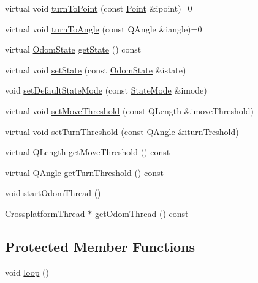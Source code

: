 \begin{DoxyCompactItemize}
\item 
virtual void \mbox{\hyperlink{classokapi_1_1OdomChassisController_a4566bc34f36fd107bc868b17942f4245}{turn\+To\+Point}} (const \mbox{\hyperlink{structokapi_1_1Point}{Point}} \&ipoint)=0
\item 
virtual void \mbox{\hyperlink{classokapi_1_1OdomChassisController_ac90298bb9081d95c52800dbf679dd658}{turn\+To\+Angle}} (const Q\+Angle \&iangle)=0
\item 
virtual \mbox{\hyperlink{structokapi_1_1OdomState}{Odom\+State}} \mbox{\hyperlink{classokapi_1_1OdomChassisController_a4f4a588ea6e302e9cf13fb776ce0c5e4}{get\+State}} () const
\item 
virtual void \mbox{\hyperlink{classokapi_1_1OdomChassisController_a1e3a4b62e89ab0869c4046983ab7d11b}{set\+State}} (const \mbox{\hyperlink{structokapi_1_1OdomState}{Odom\+State}} \&istate)
\item 
void \mbox{\hyperlink{classokapi_1_1OdomChassisController_a79152ae9fb43abbb51179f7bd7ce5fde}{set\+Default\+State\+Mode}} (const \mbox{\hyperlink{namespaceokapi_af37fbd761bd859a00ff4dd4a87dd8c07}{State\+Mode}} \&imode)
\item 
virtual void \mbox{\hyperlink{classokapi_1_1OdomChassisController_adf98b0e1b91d1f72cce5b76b992257a0}{set\+Move\+Threshold}} (const Q\+Length \&imove\+Threshold)
\item 
virtual void \mbox{\hyperlink{classokapi_1_1OdomChassisController_a771daa37b47909a523571e9173f676d5}{set\+Turn\+Threshold}} (const Q\+Angle \&iturn\+Treshold)
\item 
virtual Q\+Length \mbox{\hyperlink{classokapi_1_1OdomChassisController_a6523c9291a330272edcf951e6653ae02}{get\+Move\+Threshold}} () const
\item 
virtual Q\+Angle \mbox{\hyperlink{classokapi_1_1OdomChassisController_a17e3855a8b8ecdb9a027828d604722d9}{get\+Turn\+Threshold}} () const
\item 
void \mbox{\hyperlink{classokapi_1_1OdomChassisController_a519c7ad1905fbf9132c95e1e14bc973c}{start\+Odom\+Thread}} ()
\item 
\mbox{\hyperlink{classCrossplatformThread}{Crossplatform\+Thread}} $\ast$ \mbox{\hyperlink{classokapi_1_1OdomChassisController_a6ab78730e502dc551894e7efdb9f4edf}{get\+Odom\+Thread}} () const
\end{DoxyCompactItemize}
\subsection*{Protected Member Functions}
\begin{DoxyCompactItemize}
\item 
void \mbox{\hyperlink{classokapi_1_1OdomChassisController_aafdbc13dae2d14e13b879dd7d93993c7}{loop}} ()
\end{DoxyCompactItemize}
